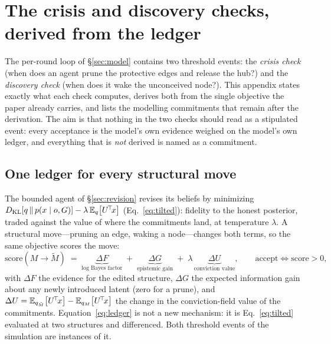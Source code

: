 
\section{The crisis and discovery checks, derived from the ledger}
\label{app:crisis-discovery}

The per-round loop of \S\ref{sec:model} contains two threshold events: the \emph{crisis check}
(when does an agent prune the protective edges and release the hub?) and the \emph{discovery
check} (when does it wake the unconceived node?). This appendix states exactly what each check
computes, derives both from the single objective the paper already carries, and lists the
modelling commitments that remain after the derivation. The aim is that nothing in the two
checks should read as a stipulated event: every acceptance is the model's own evidence weighed
on the model's own ledger, and everything that is \emph{not} derived is named as a commitment.

\subsection{One ledger for every structural move}

The bounded agent of \S\ref{sec:revision} revises its beliefs by minimizing
$D_{\mathrm{KL}}\!\left[q\,\middle\|\,p(x\mid o,G)\right]-\lambda\,\mathbb{E}_{q}\!\left[U^{\!\top}\!x\right]$ (Eq.~\ref{eq:tilted}): fidelity to the
honest posterior, traded against the value of where the commitments land, at temperature
$\lambda$. A structural move---pruning an edge, waking a node---changes both terms, so the same
objective scores the move:
\begin{equation}
\mathrm{score}(M\!\to\!\tilde M)
\;=\;
\underbrace{\Delta F}_{\text{log Bayes factor}}
\;+\;
\underbrace{\Delta G}_{\text{epistemic gain}}
\;+\;
\lambda\,\underbrace{\Delta U}_{\text{conviction value}},
\qquad
\text{accept}\iff \mathrm{score}>0,
\label{eq:ledger}
\end{equation}
with $\Delta F$ the evidence for the edited structure, $\Delta G$ the expected information gain
about any newly introduced latent (zero for a prune), and
$\Delta U = \mathbb{E}_{q_{\tilde M}}\!\left[U^{\!\top}\!x\right]-\mathbb{E}_{q_{M}}\!\left[U^{\!\top}\!x\right]$ the change in the
conviction-field value of the commitments. Equation~\eqref{eq:ledger} is not a new mechanism:
it is Eq.~\eqref{eq:tilted} evaluated at two structures and differenced. Both threshold events
of the simulation are instances of it.

